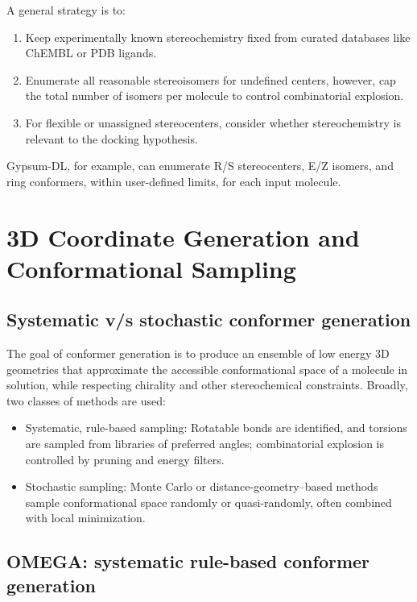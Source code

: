 \documentclass[12pt, a4paper]{article}
\begin{document}
A general strategy is to:
\begin{enumerate}
  \item Keep experimentally known stereochemistry fixed from curated databases like ChEMBL or PDB ligands.
  \item Enumerate all reasonable stereoisomers for undefined centers, however, cap the total number of isomers per molecule to control combinatorial explosion.
  \item For flexible or unassigned stereocenters, consider whether stereochemistry is relevant to the docking hypothesis.
\end{enumerate}

Gypsum-DL, for example, can enumerate R/S stereocenters, E/Z isomers, and ring conformers, within user-defined limits, for each input molecule.\cite{CH6_Ropp2019}

\section{3D Coordinate Generation and Conformational Sampling}

\subsection{Systematic v/s stochastic conformer generation}

The goal of conformer generation is to produce an ensemble of low energy 3D geometries that approximate the accessible conformational space of a molecule in solution, while respecting chirality and other stereochemical constraints. Broadly, two classes of methods are used:\cite{CH6_Hawkins2010,CH6_Riniker2015} 
\begin{itemize}
  \item Systematic, rule-based sampling: Rotatable bonds are identified, and torsions are sampled from libraries of preferred angles; combinatorial explosion is controlled by pruning and energy filters.
  \item Stochastic sampling: Monte Carlo or distance-geometry–based methods sample conformational space randomly or quasi-randomly, often combined with local minimization.
\end{itemize}

\subsection{OMEGA: systematic rule-based conformer generation}
\end{document}
